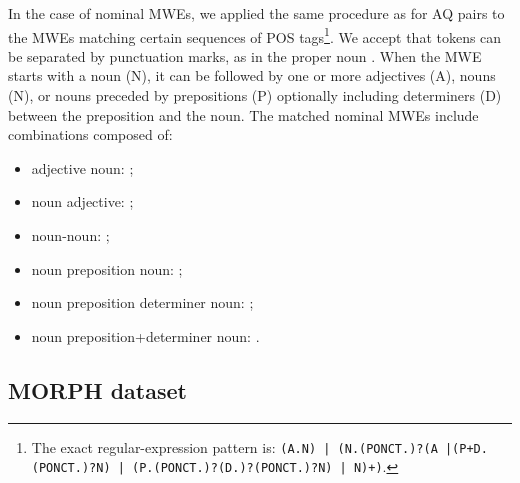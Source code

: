 \documentclass[output=paper,modfonts]{langscibook}
\begin{document}
In the case of nominal MWEs, we applied the same procedure as for AQ pairs to the MWEs matching certain sequences of POS tags\footnote{The exact regular-expression pattern is: \texttt{(A.N) | (N.(PONCT.)?(A |(P+D.(PONCT.)?N) | (P.(PONCT.)?(D.)?(PONCT.)?N) | N)+)}.}. We accept that tokens can be separated by punctuation marks, as in the proper noun . When the MWE starts with a noun (N), it can be followed by one or more adjectives (A), nouns (N), or nouns preceded by prepositions (P) optionally including determiners (D) between the preposition and the noun.
The matched nominal MWEs include combinations composed of: 
\begin{itemize}
\item adjective noun: ;
\item noun adjective: ;
\item noun-noun: ;
\item noun preposition noun: ;
\item noun preposition determiner noun: ;
\item noun preposition+determiner noun: .
\end{itemize}



\subsection{MORPH dataset} %
\label{subsec:morph}
\end{document}
